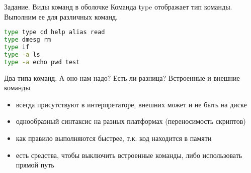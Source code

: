 \begin{frame}[fragile]{Задание. Виды команд в оболочке}
Команда  \alert{type} отображает тип команды. Выполним ее для различных команд.
\begin{lstlisting}[language=bash]
type type cd help alias read
type dmesg rm
type if
type -a ls
type -a echo pwd test
\end{lstlisting}
Два типа команд. А оно нам надо? Есть ли разница?
\pause
Встроенные и внешние команды
\begin{itemize}
    \item всегда присутствуют в интерпретаторе, внешних может и не быть на диске
    \item однообразный синтаксис на разных платформах (переносимость скриптов)
    \item как правило выполняются быстрее, т.к. код находится в памяти
    \item есть средства, чтобы выключить встроенные команды, либо использовать прямой путь
\end{itemize}
\end{frame}
